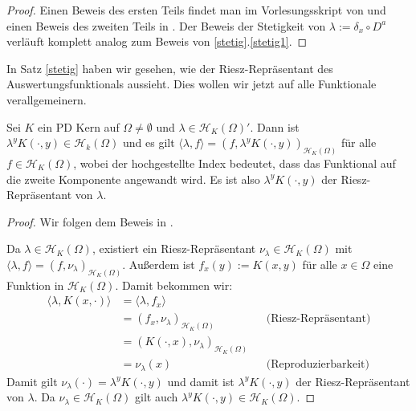 \begin{proof}
Einen Beweis des ersten Teils findet man im Vorlesungsskript von \textcite[Proposition 7.13]{Santin.2017} und einen Beweis des zweiten Teils in \textcite[Proposition 3.14]{Santin.2017}. Der Beweis der Stetigkeit von $\lambda := \delta_x \circ D^a$ verläuft komplett analog zum Beweis von \ref{stetig}.\ref{stetig1}.
\end{proof}

In Satz \ref{stetig} haben wir gesehen, wie der Riesz-Repräsentant des Auswertungsfunktionals aussieht. Dies wollen wir jetzt auf alle Funktionale verallgemeinern.

\begin{theorem}
\label{Riesz}
Sei $K$ ein \ac{PD} Kern auf $\Omega \neq \emptyset$ und $\lambda \in \mathcal{H}_K (\Omega)'$. Dann ist $\lambda^y K(\cdot,y) \in \mathcal{H}_k(\Omega)$ und es gilt $\langle \lambda,f \rangle = \left(f,\lambda^y K(\cdot,y)\right)_{\mathcal{H}_K(\Omega)}$ für alle $f \in \mathcal{H}_K(\Omega)$, wobei der hochgestellte Index bedeutet, dass das Funktional auf die zweite Komponente angewandt wird. Es ist also $\lambda^y K(\cdot,y)$ der Riesz-Repräsentant von $\lambda$.
\end{theorem}

\begin{proof}
Wir folgen dem Beweis in \textcite[Proposition 7.8]{Santin.2017}.

Da $\lambda \in \mathcal{H}_K(\Omega)$, existiert ein Riesz-Repräsentant $\nu_\lambda \in \mathcal{H}_K(\Omega)$ mit $\langle \lambda ,f \rangle = \left(f, \nu_\lambda\right)_{\mathcal{H}_K(\Omega)}$. Außerdem ist $f_x(y) := K(x,y)$ für alle $x \in \Omega$ eine Funktion in $\mathcal{H}_K (\Omega)$. Damit bekommen wir:
\begin{align*}
\langle \lambda, K(x,\cdot) \rangle &= \langle \lambda,f_x \rangle\\ 
&= \left(f_x, \nu_\lambda\right)_{\mathcal{H}_K (\Omega)} &&\text{(Riesz-Repräsentant)}\\ 
&= \left(K(\cdot,x), \nu_\lambda\right)_{\mathcal{H}_K (\Omega)}\\ 
&= \nu_\lambda(x) &&\text{(Reproduzierbarkeit)}
\end{align*}
Damit gilt $\nu_\lambda(\cdot) = \lambda^y K(\cdot,y)$ und damit ist $\lambda^yK(\cdot,y)$ der Riesz-Repräsentant von $\lambda$. Da $\nu_\lambda \in \mathcal{H}_K (\Omega)$ gilt auch $\lambda^y K(\cdot,y) \in \mathcal{H}_K (\Omega)$.
\end{proof}

